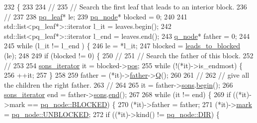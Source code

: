 \begin{DoxyCode}
232 \{
233 
234     \textcolor{comment}{//}
235     \textcolor{comment}{// Search the first leaf that leads to an interior block.}
236     \textcolor{comment}{//}
237 
238     \mbox{\hyperlink{classpq__leaf}{pq\_leaf}}* le;
239     \mbox{\hyperlink{classpq__node}{pq\_node}}* blocked = 0;
240     
241     std::list<pq\_leaf*>::iterator l\_it = leaves.begin();
242     std::list<pq\_leaf*>::iterator l\_end = leaves.end();
243     \mbox{\hyperlink{classq__node}{q\_node}}* father = 0;
244 
245     \textcolor{keywordflow}{while} (l\_it != l\_end ) \{
246     le = *l\_it;
247     blocked = \mbox{\hyperlink{classpq__tree_adf4c0caf846fd0c5d793e4797ec46e3e}{leads\_to\_blocked}} (le);
248 
249     \textcolor{keywordflow}{if} (blocked != 0) \{
250         \textcolor{comment}{//}
251         \textcolor{comment}{// Search the father of this block.}
252         \textcolor{comment}{//}
253         
254         \mbox{\hyperlink{classpq__tree_ab47263066d4b0acc70e00043870d748a}{sons\_iterator}} it = blocked->\mbox{\hyperlink{classpq__node_a5e8a5defa0fec4ff2e82fabee97296b4}{pos}};
255         \textcolor{keywordflow}{while} (!(*it)->is\_endmost) \{
256         ++it;
257         \}
258         
259         father = (*it)->\mbox{\hyperlink{classpq__node_a3e7c886498c76c633f057fb42ff9c435}{father}}->\mbox{\hyperlink{classpq__node_aeeefcfcd19dbe4ca94e190006e8dd484}{Q}}();
260         
261         \textcolor{comment}{//}
262         \textcolor{comment}{// give all the children the right father. }
263         \textcolor{comment}{//}
264         
265         it = father->\mbox{\hyperlink{classpq__node_a2cc030cfa4560872acea8b50ebd0542b}{sons}}.\mbox{\hyperlink{classsymlist_a525b8d44af5d771fe15916372515cce0}{begin}}();
266         \mbox{\hyperlink{classpq__tree_ab47263066d4b0acc70e00043870d748a}{sons\_iterator}} end = father->\mbox{\hyperlink{classpq__node_a2cc030cfa4560872acea8b50ebd0542b}{sons}}.\mbox{\hyperlink{classsymlist_a7283589fa01f79d722f8256d7a6a7883}{end}}();
267         
268         \textcolor{keywordflow}{while} (it != end) \{
269         \textcolor{keywordflow}{if} ((*it)->mark == \mbox{\hyperlink{classpq__node_a6236b20cd5f6cc02cb5f637ed34c96d9a70312622ded9f04f068838ec195fc53c}{pq\_node::BLOCKED}}) \{
270             (*it)->father = father;
271             (*it)->\mbox{\hyperlink{classpq__node_aee913582a7b268ce2570bee8a8367c50}{mark}} = \mbox{\hyperlink{classpq__node_a6236b20cd5f6cc02cb5f637ed34c96d9a8a88820f8cee58f43fef7160cdf1d7dc}{pq\_node::UNBLOCKED}};
272             \textcolor{keywordflow}{if} ((*it)->kind() != \mbox{\hyperlink{classpq__node_a96827bdca8bf81d20213405dd27f8fa6a5afa3e7100ee720a1569cfff090a210d}{pq\_node::DIR}}) \{

\end{DoxyCode}
